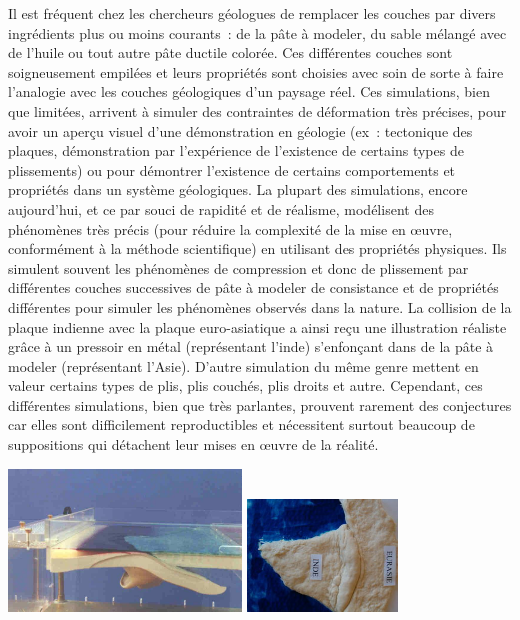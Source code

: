 \documentclass[a4paper,11pt]{article}
\begin{document}
Il est fréquent chez les chercheurs géologues de remplacer les couches par divers ingrédients plus ou moins courants~: de la pâte à modeler, du sable mélangé avec de l'huile ou tout autre pâte ductile colorée.
Ces différentes couches sont soigneusement empilées et leurs propriétés sont choisies avec soin de sorte à faire l'analogie avec les couches géologiques d'un paysage réel.
Ces simulations, bien que limitées, arrivent à simuler des contraintes de déformation très précises, pour avoir un aperçu visuel d'une démonstration en géologie (ex~: tectonique des plaques, démonstration par l'expérience de l'existence de certains types de plissements) ou pour démontrer l'existence de certains comportements et propriétés dans un système géologiques.
La plupart des simulations, encore aujourd'hui, et ce par souci de rapidité et de réalisme, modélisent des phénomènes très précis (pour réduire la complexité de la mise en œuvre, conformément à la méthode scientifique) en utilisant des propriétés physiques.
Ils simulent souvent les phénomènes de compression et donc de plissement par différentes couches successives de pâte à modeler de consistance et de propriétés différentes pour simuler les phénomènes observés dans la nature.
La collision de la plaque indienne avec la plaque euro-asiatique a ainsi reçu une illustration réaliste grâce à un pressoir en métal (représentant l'inde) s'enfonçant dans de la pâte à modeler (représentant l'Asie).
D'autre simulation du même genre mettent en valeur certains types de plis, plis couchés, plis droits et autre. Cependant, ces différentes simulations, bien que très parlantes, prouvent rarement des conjectures car elles sont difficilement reproductibles et nécessitent surtout beaucoup de suppositions qui détachent leur mises en œuvre de la réalité.

\begin{center}
  \includegraphics[width=6.2cm]{Images/simulation_physique.png}
  \includegraphics[width=4cm, angle=90]{Images/inde.jpg}
\end{center}
\end{document}
